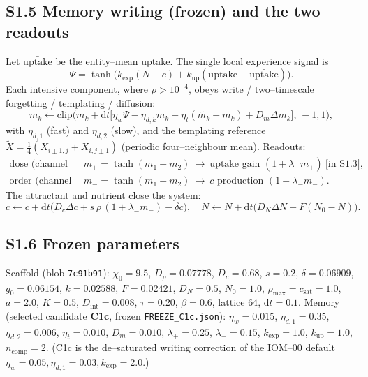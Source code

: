 \documentclass[11pt]{article}
\begin{document}
\subsection*{S1.5 Memory writing (frozen) and the two readouts}
Let $\bar{\mathrm{uptake}}$ be the entity--mean uptake. The single local experience signal is
\begin{equation}
\Psi=\tanh\!\big(k_{\exp}(N-c)+k_{\mathrm{up}}(\mathrm{uptake}-\bar{\mathrm{uptake}})\big).
\end{equation}
Each intensive component, where $\rho>10^{-4}$, obeys write / two--timescale forgetting / templating /
diffusion:
\begin{equation}
m_k\leftarrow\mathrm{clip}\!\Big(m_k+\mathrm{d}t\big[\eta_w\Psi-\eta_{d,k}m_k+\eta_t(\widetilde{m_k}-m_k)+D_m\Delta m_k\big],\,-1,1\Big),
\label{eq:mem}
\end{equation}
with $\eta_{d,1}$ (fast) and $\eta_{d,2}$ (slow), and the templating reference
$\widetilde{X}=\tfrac14(X_{i\pm1,j}+X_{i,j\pm1})$ (periodic four--neighbour mean). Readouts:
\begin{align}
\text{dose (channel 1):}\ &m_+=\tanh(m_1+m_2)\ \to\ \text{uptake gain }(1+\lambda_+m_+)\ \text{[in S1.3]},\\
\text{order (channel 2):}\ &m_-=\tanh(m_1-m_2)\ \to\ c\text{ production }(1+\lambda_-m_-).
\end{align}
The attractant and nutrient close the system:
\begin{equation}
c\leftarrow c+\mathrm{d}t\big(D_c\Delta c+s\,\rho\,(1+\lambda_-m_-)-\delta c\big),\quad
N\leftarrow N+\mathrm{d}t\big(D_N\Delta N+F(N_0-N)\big).
\end{equation}

\subsection*{S1.6 Frozen parameters}
Scaffold (blob \texttt{7c91b91}): $\chi_0=9.5$, $D_\rho=0.07778$, $D_c=0.68$, $s=0.2$, $\delta=0.06909$,
$g_0=0.06154$, $k=0.02588$, $F=0.02421$, $D_N=0.5$, $N_0=1.0$, $\rho_{\max}=c_{\mathrm{sat}}=1.0$, $a=2.0$,
$K=0.5$, $D_{\mathrm{int}}=0.008$, $\tau=0.20$, $\beta=0.6$, lattice $64$, $\mathrm{d}t=0.1$.
Memory (selected candidate \textbf{C1c}, frozen \texttt{FREEZE\_C1c.json}): $\eta_w=0.015$,
$\eta_{d,1}=0.35$, $\eta_{d,2}=0.006$, $\eta_t=0.010$, $D_m=0.010$, $\lambda_+=0.25$, $\lambda_-=0.15$,
$k_{\exp}=1.0$, $k_{\mathrm{up}}=1.0$, $n_{\mathrm{comp}}=2$. (C1c is the de--saturated writing correction of
the IOM--00 default $\eta_w=0.05,\eta_{d,1}=0.03,k_{\exp}=2.0$.)
\end{document}
